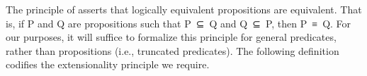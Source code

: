The principle of  asserts that logically equivalent propositions are equivalent.  That is, if \ab P and \ab Q are propositions such that \ab P~\af ⊆~\ab Q and \ab Q~\af ⊆~\ab P, then \ab P~\ad ≡~\ab Q. For our purposes, it will suffice to formalize this principle for general predicates, rather than propositions (i.e., truncated predicates). The following definition codifies the extensionality principle we require.
\ccpad
\begin{code}%
\>[0]\AgdaSpace{}%
\AgdaSymbol{:}\AgdaSpace{}%
\AgdaSymbol{(}\AgdaSpace{}%
\AgdaSpace{}%
\AgdaSymbol{:}\AgdaSpace{}%
\AgdaSymbol{)}\AgdaSpace{}%
\AgdaSpace{}%
\AgdaSymbol{(}\AgdaSpace{}%
\AgdaSpace{}%
\AgdaSymbol{)}\AgdaSpace{}%
\AgdaSpace{}%
\<%
\\
\>[0]\AgdaSpace{}%
\AgdaSpace{}%
\AgdaSpace{}%
\AgdaSymbol{=}\AgdaSpace{}%
\AgdaSpace{}%
\AgdaSymbol{\{}\AgdaSpace{}%
\AgdaSymbol{:}\AgdaSpace{}%
\AgdaSpace{}%
\AgdaSymbol{\}\{}\AgdaSpace{}%
\AgdaSpace{}%
\AgdaSymbol{:}\AgdaSpace{}%
\AgdaSpace{}%
\AgdaSpace{}%
\AgdaSpace{}%
\AgdaSymbol{\}}\AgdaSpace{}%
\AgdaSpace{}%
\AgdaSpace{}%
\AgdaSpace{}%
\AgdaSpace{}%
\AgdaSpace{}%
\AgdaSpace{}%
\AgdaSpace{}%
\AgdaSpace{}%
\AgdaSpace{}%
\AgdaSpace{}%
\AgdaSpace{}%
\<%
\end{code}
